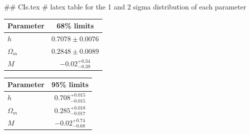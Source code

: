 ## CIs.tex
# latex table for the 1 and 2 sigma distribution of each parameter

\begin{tabular} { l  c}
 Parameter &  68\% limits\\
\hline
{\boldmath$h              $} & $0.7078\pm 0.0076          $\\
{\boldmath$\Omega_m       $} & $0.2848\pm 0.0089          $\\
{\boldmath$M              $} & $-0.02^{+0.34}_{-0.39}     $\\
\hline
\end{tabular}

\begin{tabular} { l  c}
 Parameter &  95\% limits\\
\hline
{\boldmath$h              $} & $0.708^{+0.015}_{-0.015}   $\\
{\boldmath$\Omega_m       $} & $0.285^{+0.018}_{-0.017}   $\\
{\boldmath$M              $} & $-0.02^{+0.74}_{-0.68}     $\\
\hline
\end{tabular}
